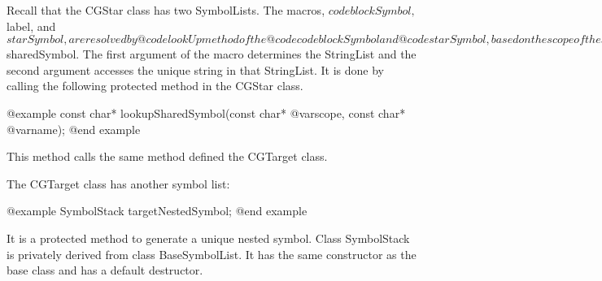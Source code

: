 Recall that the CGStar class has two SymbolLists. The macros,
$codeblockSymbol, $label, and $starSymbol, are resolved by @code{lookUp}
method of the @code{codeblockSymbol} and @code{starSymbol}, based on
the scope of the symbol. If the symbol already exists in the SymbolList,
it returns that unique symbol. Otherwise, it creates a unique symbol
in the scope of interest.

If we want to generate a unique symbol in the file scope, we use a symbol
list defined in the target class.

@example
ScopedSymbolList sharedSymbol;
@end example

It is a protected member of the CGTarget class. ScopedSymbolList class is
privately derived from class NamedList to store a list of SymbolLists, 
It has the same constructor as the base class. 

@example
void setSeparator(char @var{set});
void setCounter(int* @var{count});
@end example

These methods in the ScopedSymbolList class set the separator and the counter
pointer of all SymbolLists in the list.

@example
const char* lookup(const char* @var{scope}, const char* @var{name});
@end example

In this method, the first argument determines the SymbolList in the list named
@var{scope}, and the second argument determines the unique symbol in the
SymbolList. If no SymbolList is found with that name, we creats a new
SymbolList and insert it in the list.

The SymbolLists in the list are deleted in the destructor and in the following
method:

@example
void initialize();
@end example

Now, we can explain how to expand the last macro defined in the CGStar class:
$sharedSymbol. The first argument of the macro determines the StringList
and the second argument accesses the unique string in that StringList. It is
done by calling the following protected method in the CGStar class.

@example
const char* lookupSharedSymbol(const char* @var{scope}, const char* @var{name});
@end example

This method calls the same method defined the CGTarget class.

The CGTarget class has another symbol list:

@example
SymbolStack targetNestedSymbol;
@end example

It is a protected method to generate a unique nested symbol.
Class SymbolStack is privately derived from class BaseSymbolList. It has the
same constructor as the base class and has a default destructor.

